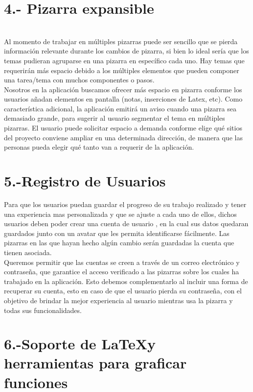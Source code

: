 \documentclass[a4paper, oneside, final]{scrartcl}
\begin{document}
\section{4.- Pizarra expansible}\\ %

 Al momento de trabajar en múltiples pizarras puede ser sencillo que se pierda información relevante durante los cambios de pizarra, si bien lo ideal sería que los temas pudieran agruparse en una pizarra en específico cada uno. Hay temas que requerirán más espacio debido a los múltiples elementos que pueden componer una tarea/tema con muchos componentes o pasos.\\

  Nosotros en la aplicación buscamos ofrecer más espacio en pizarra conforme los usuarios añadan elementos en pantalla (notas, inserciones de Latex, etc). Como característica adicional, la aplicación emitirá un aviso cuando una pizarra sea demasiado grande, para sugerir al usuario segmentar el tema en múltiples pizarras. El usuario puede solicitar espacio a demanda conforme elige qué sitios del proyecto conviene ampliar en una determinada dirección, de manera que las personas pueda elegir qué tanto van a requerir de la aplicación.


\noindent
\section{5.-Registro de Usuarios} %

    Para que los usuarios puedan guardar el progreso de su trabajo realizado y tener una experiencia mas personalizada y que se ajuste a cada uno de ellos, dichos usuarios deben poder crear una cuenta de usuario , en la cual sus datos quedaran guardados junto con un avatar que les permita identificarse fácilmente. Las pizarras en las que hayan hecho algún cambio serán guardadas la cuenta que tienen asociada.\\
    
    Queremos permitir que las cuentas se creen a través de un correo electrónico y contraseña, que garantice el acceso verificado a las pizarras sobre los cuales ha trabajado en la aplicación. Esto debemos complementarlo al incluir una forma de recuperar su cuenta, esto en caso de que el usuario pierda su contraseña, con el objetivo de brindar la mejor experiencia al usuario mientras usa la pizarra y todas sus funcionalidades.


\noindent
\section{6.-Soporte de \LaTeX y herramientas para graficar funciones}
    
\end{document}
